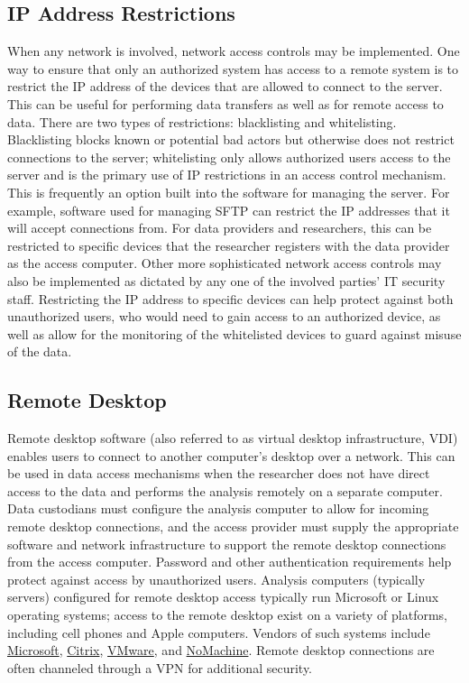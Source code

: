 \hypertarget{ip-address-restrictions}{%
\subsection{IP Address Restrictions}\label{ip-address-restrictions}}

When any network is involved, network access controls may be implemented. One way to ensure that only an authorized system has access to a remote system is to restrict the IP address of the devices that are allowed to connect to the server. This can be useful for performing data transfers as well as for remote access to data. There are two types of restrictions: blacklisting and whitelisting. Blacklisting blocks known or potential bad actors but otherwise does not restrict connections to the server; whitelisting only allows authorized users access to the server and is the primary use of IP restrictions in an access control mechanism. This is frequently an option built into the software for managing the server. For example, software used for managing SFTP can restrict the IP addresses that it will accept connections from. For data providers and researchers, this can be restricted to specific devices that the researcher registers with the data provider as the access computer. Other more sophisticated network access controls may also be implemented as dictated by any one of the involved parties' IT security staff. Restricting the IP address to specific devices can help protect against both unauthorized users, who would need to gain access to an authorized device, as well as allow for the monitoring of the whitelisted devices to guard against misuse of the data.

\hypertarget{remote-desktop}{%
\subsection{Remote Desktop}\label{remote-desktop}}

Remote desktop software (also referred to as virtual desktop infrastructure, VDI) enables users to connect to another computer's desktop over a network. This can be used in data access mechanisms when the researcher does not have direct access to the data and performs the analysis remotely on a separate computer. Data custodians must configure the analysis computer to allow for incoming remote desktop connections, and the access provider must supply the appropriate software and network infrastructure to support the remote desktop connections from the access computer. Password and other authentication requirements help protect against access by unauthorized users. Analysis computers (typically servers) configured for remote desktop access typically run Microsoft or Linux operating systems; access to the remote desktop exist on a variety of platforms, including cell phones and Apple computers. Vendors of such systems include \href{https://www.microsoft.com/en-us/p/microsoft-remote-desktop/9wzdncrfj3ps}{Microsoft}, \href{https://www.citrix.com}{Citrix}, \href{https://www.vmware.com}{VMware}, and \href{https://www.nomachine.com}{NoMachine}. Remote desktop connections are often channeled through a VPN for additional security.

